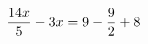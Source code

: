 \documentclass[preview]{standalone}
\begin{document}
\begin{align*}
\special{dvisvgm:raw <g id='unique000'>}\frac{14 x}{5} - 3 x = 9 - \frac{9}{2} + 8\special{dvisvgm:raw </g>}
\end{align*}
\end{document}
